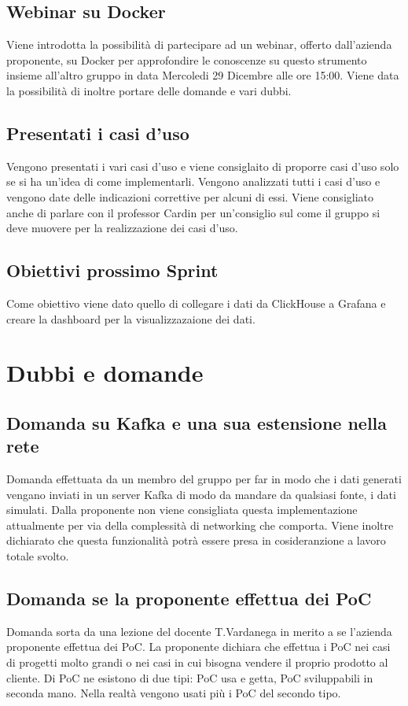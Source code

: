\documentclass{article}
\begin{document}
    \subsection{Webinar su Docker}
    Viene introdotta la possibilità di partecipare ad un webinar, offerto dall'azienda proponente, su Docker per approfondire le conoscenze su questo strumento insieme all'altro gruppo in data Mercoledi 29 Dicembre alle ore 15:00. Viene data la possibilità di inoltre portare delle domande e vari dubbi.
    \subsection{Presentati i casi d'uso}
    Vengono presentati i vari casi d'uso e viene consiglaito di proporre casi d'uso solo se si ha un'idea di come implementarli. Vengono analizzati tutti i casi d'uso e vengono date delle indicazioni correttive per alcuni di essi. Viene consigliato anche di parlare con il professor Cardin
    per un'consiglio sul come il gruppo si deve muovere per la realizzazione dei casi d'uso. 
    \subsection{Obiettivi prossimo Sprint}
    Come obiettivo viene dato quello di collegare i dati da ClickHouse a Grafana e creare la dashboard per la visualizzazaione dei dati.
\section{Dubbi e domande}
    \subsection{Domanda su Kafka e una sua estensione nella rete}
    Domanda effettuata da un membro del gruppo per far in modo che i dati generati vengano inviati in un server Kafka di modo da mandare da qualsiasi fonte, i dati simulati. Dalla proponente non viene consigliata questa implementazione attualmente per via della complessità di networking che comporta. Viene inoltre
    dichiarato che questa funzionalità potrà essere presa in cosideranzione a lavoro totale svolto.
    \subsection{Domanda se la proponente effettua dei PoC}
    Domanda sorta da una lezione del docente T.Vardanega in merito a se l'azienda proponente effettua dei PoC. La proponente dichiara che effettua i PoC nei casi di progetti molto grandi o nei casi in cui bisogna vendere il proprio prodotto al cliente. Di PoC ne esistono di due tipi:
    PoC usa e getta, PoC sviluppabili in seconda mano. Nella realtà vengono usati più i PoC del secondo tipo.
\end{document}
